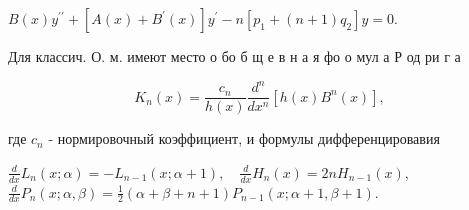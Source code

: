 \documentclass[10pt]{article}
\begin{document}
$B(x) y^{\prime \prime}+\left[A(x)+B^{\prime}(x)\right] y^{\prime}-n\left[p_{1}+(n+1) q_{2}\right] y=0$.



Для классич. О. м. имеют место о бо б щ е в н а я фо о мул а Р од ри г а



\[

K_{n}(x)=\frac{c_{n}}{h(x)} \frac{d^{n}}{d x^{n}}\left[h(x) B^{n}(x)\right],

\]



где $c_{n}$ - нормировочный коэффициент, и формулы дифференцировавия



$\frac{d}{d x} L_{n}(x ; \alpha)=-L_{n-1}(x ; \alpha+1), \quad \frac{d}{d x} H_{n}(x)=2 n H_{n-1}(x)$, $\frac{d}{d x} P_{n}(x ; \alpha, \beta)=\frac{1}{2}(\alpha+\beta+n+1) P_{n-1}(x ; \alpha+1, \beta+1)$.
\end{document}
